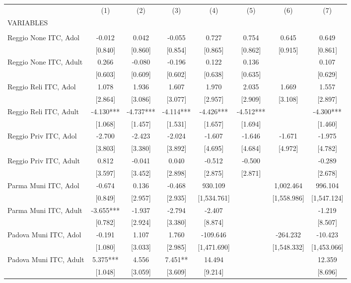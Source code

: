 \begin{tabular}{lccccccc} \hline
 & (1) & (2) & (3) & (4) & (5) & (6) & (7) \\
VARIABLES &  &  &  &  &  &  &  \\ \hline
 &  &  &  &  &  &  &  \\
Reggio None ITC, Adol & -0.012 & 0.042 & -0.055 & 0.727 & 0.754 & 0.645 & 0.649 \\
 & [0.840] & [0.860] & [0.854] & [0.865] & [0.862] & [0.915] & [0.861] \\
Reggio None ITC, Adult & 0.266 & -0.080 & -0.196 & 0.122 & 0.136 &  & 0.107 \\
 & [0.603] & [0.609] & [0.602] & [0.638] & [0.635] &  & [0.629] \\
Reggio Reli ITC, Adol & 1.078 & 1.936 & 1.607 & 1.970 & 2.035 & 1.669 & 1.557 \\
 & [2.864] & [3.086] & [3.077] & [2.957] & [2.909] & [3.108] & [2.897] \\
Reggio Reli ITC, Adult & -4.130*** & -4.737*** & -4.114*** & -4.426*** & -4.512*** &  & -4.300*** \\
 & [1.068] & [1.457] & [1.531] & [1.657] & [1.694] &  & [1.460] \\
Reggio Priv ITC, Adol & -2.700 & -2.423 & -2.024 & -1.607 & -1.646 & -1.671 & -1.975 \\
 & [3.803] & [3.380] & [3.892] & [4.695] & [4.684] & [4.972] & [4.782] \\
Reggio Priv ITC, Adult & 0.812 & -0.041 & 0.040 & -0.512 & -0.500 &  & -0.289 \\
 & [3.597] & [3.452] & [2.898] & [2.875] & [2.871] &  & [2.678] \\
Parma Muni ITC, Adol & -0.674 & 0.136 & -0.468 & 930.109 &  & 1,002.464 & 996.104 \\
 & [0.849] & [2.957] & [2.935] & [1,534.761] &  & [1,558.986] & [1,547.124] \\
Parma Muni ITC, Adult & -3.655*** & -1.937 & -2.794 & -2.407 &  &  & -1.219 \\
 & [0.782] & [2.924] & [3.380] & [8.874] &  &  & [8.507] \\
Padova Muni ITC, Adol & -0.191 & 1.107 & 1.760 & -109.646 &  & -264.232 & -10.423 \\
 & [1.080] & [3.033] & [2.985] & [1,471.690] &  & [1,548.332] & [1,453.066] \\
Padova Muni ITC, Adult & 5.375*** & 4.556 & 7.451** & 14.494 &  &  & 12.359 \\
 & [1.048] & [3.059] & [3.609] & [9.214] &  &  & [8.696] \\

\end{tabular}
